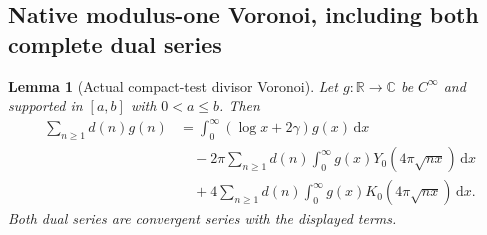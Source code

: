 \documentclass[11pt,a4paper]{article}
\numberwithin{equation}{section}
\newtheorem{lemma}[theorem]{Lemma}
\theoremstyle{definition}
\newcommand{\R}{\mathbb R}
\newcommand{\C}{\mathbb C}
\newcommand{\dd}{\,\mathrm d}
\begin{document}
\subsection{Native modulus-one Voronoi, including both complete dual series}
\begin{lemma}[Actual compact-test divisor Voronoi]\label{lem:voronoi}
Let $g:\R\to\C$ be $C^\infty$ and supported in $[a,b]$ with $0<a\le b$.
Then
\begin{align}\label{eq:voronoi}
 \sum_{n\ge1}d(n)g(n)
 &=\int_0^\infty(\log x+2\gamma)g(x)\dd x\\
 &\quad-2\pi\sum_{n\ge1}d(n)\int_0^\infty
                          g(x)Y_0(4\pi\sqrt{nx})\dd x\nonumber\\
 &\quad+4\sum_{n\ge1}d(n)\int_0^\infty
                          g(x)K_0(4\pi\sqrt{nx})\dd x.\nonumber
\end{align}
Both dual series are convergent series with the displayed terms.
\end{lemma}
\end{document}
